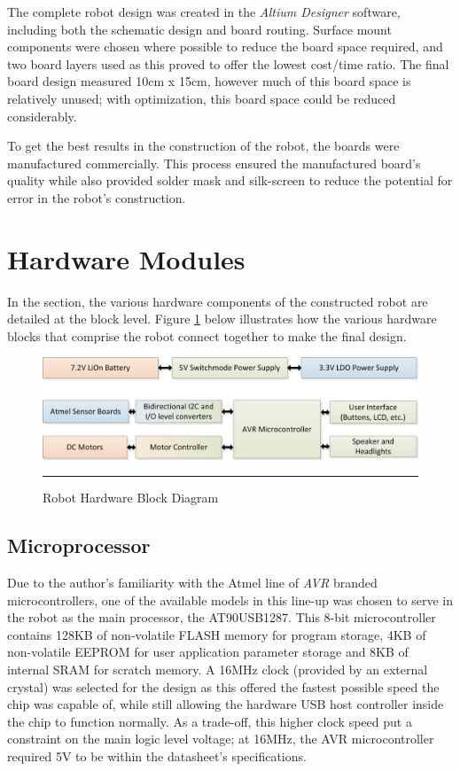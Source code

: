 The complete robot design was created in the \textit{Altium Designer} software, including both the schematic design and board routing. Surface mount components were chosen where possible to reduce the board space required, and two board layers used as this proved to offer the lowest cost/time ratio. The final board design measured 10cm x 15cm, however much of this board space is relatively unused; with optimization, this board space could be reduced considerably.

To get the best results in the construction of the robot, the boards were manufactured commercially. This process ensured the manufactured board's quality while also provided solder mask and silk-screen to reduce the potential for error in the robot's construction.

\section{Hardware Modules}

In the section, the various hardware components of the constructed robot are detailed at the block level. Figure \ref{fig:robotblockhw} below illustrates how the various hardware blocks that comprise the robot connect together to make the final design.

\begin{figure}[H]
	\vspace{1em}
	\centering
		\includegraphics[width=140mm]{./Figures/BlockDiagram.png}
	\rule{35em}{0.5pt}
	\caption[Hardware Block Diagram]{Robot Hardware Block Diagram}
	\label{fig:robotblockhw}
\end{figure}

\FloatBarrier
\subsection{Microprocessor}

Due to the author's familiarity with the Atmel line of \textit{AVR} branded microcontrollers, one of the available models in this line-up was chosen to serve in the robot as the main processor, the AT90USB1287. This 8-bit microcontroller contains 128KB of non-volatile FLASH memory for program storage, 4KB of non-volatile EEPROM for user application parameter storage and 8KB of internal SRAM for scratch memory. A 16MHz clock (provided by an external crystal) was selected for the design as this offered the fastest possible speed the chip was capable of, while still allowing the hardware USB host controller inside the chip to function normally. As a trade-off, this higher clock speed put a constraint on the main logic level voltage; at 16MHz, the AVR microcontroller required 5V to be within the datasheet's specifications.

